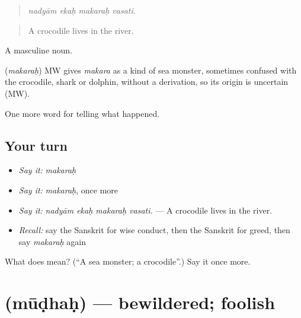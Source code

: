 \begin{quote}
   
\end{quote}

\begin{quote}
\emph{nadyām ekaḥ makaraḥ vasati.}
\end{quote}

\begin{quote}
A crocodile lives in the river.
\end{quote}

A masculine noun.

\begin{cousinweb}
\textbf{} (\emph{makaraḥ}) MW gives \emph{makara} as a kind of sea monster, sometimes confused with the crocodile, shark or dolphin, without a derivation, so its origin is uncertain (MW).
\end{cousinweb}

\begin{grammarlens}[title={What you've built}]
One more word for telling what happened.
\end{grammarlens}

\subsection*{Your turn}
\begin{itemize}
\raggedright
  \item \emph{Say it:} \emph{makaraḥ}
  \item \emph{Say it:} \emph{makaraḥ}, once more
  \item \emph{Say it:} \emph{nadyām ekaḥ makaraḥ vasati.} — A crocodile lives in the river.
  \item \emph{Recall:} say the Sanskrit for wise conduct, then the Sanskrit for greed, then say \emph{makaraḥ} again
\end{itemize}

\begin{tcolorbox}[breakable,colback=teal!4,colframe=teal!35!black,title={Before you move on}]
What does  mean? (\textquotedblleft{}A sea monster; a crocodile\textquotedblright{}.) Say it once more.
\end{tcolorbox}
\section[\texorpdfstring{\sk{मूढः} (mūḍhaḥ)}{मूढः (mūḍhaḥ)}]{ (mūḍhaḥ) — bewildered; foolish}

